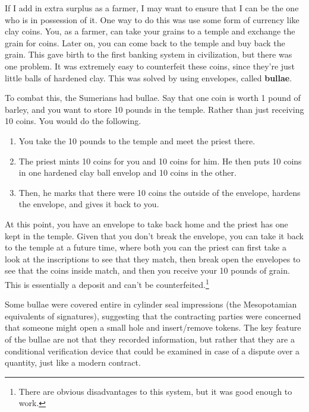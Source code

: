 \documentclass{article}
\begin{document}
    If I add in extra surplus as a farmer, I may want to ensure that I can be the one who is in possession of it. One way to do this was use some form of currency like clay coins. You, as a farmer, can take your grains to a temple and exchange the grain for coins. Later on, you can come back to the temple and buy back the grain. This gave birth to the first banking system in civilization, but there was one problem. It was extremely easy to counterfeit these coins, since they're just little balls of hardened clay. This was solved by using envelopes, called \textbf{bullae}. 

    \begin{finance}
      To combat this, the Sumerians had bullae. Say that one coin is worth 1 pound of barley, and you want to store 10 pounds in the temple. Rather than just receiving 10 coins. You would do the following. 
      \begin{enumerate}
        \item You take the 10 pounds to the temple and meet the priest there. 
        \item The priest mints 10 coins for you and 10 coins for him. He then puts 10 coins in one hardened clay ball envelop and 10 coins in the other.  
        \item Then, he marks that there were 10 coins the outside of the envelope, hardens the envelope, and gives it back to you. 
      \end{enumerate}
      At this point, you have an envelope to take back home and the priest has one kept in the temple. Given that you don't break the envelope, you can take it back to the temple at a future time, where both you can the priest can first take a look at the inscriptions to see that they match, then break open the envelopes to see that the coins inside match, and then you receive your 10 pounds of grain. This is essentially a deposit and can't be counterfeited.\footnote{There are obvious disadvantages to this system, but it was good enough to work. } 
    \end{finance} 

    Some bullae were covered entire in cylinder seal impressions (the Mesopotamian equivalents of signatures), suggesting that the contracting parties were concerned that someone might open a small hole and insert/remove tokens. The key feature of the bullae are not that they recorded information, but rather that they are a conditional verification device that could be examined in case of a dispute over a quantity, just like a modern contract. 
\end{document}
